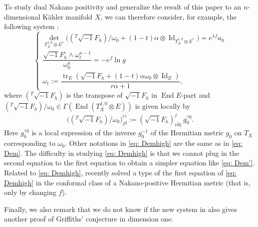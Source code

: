 \documentclass[a4, 12pt, 
]{amsart}
\numberwithin{equation}{section}
\theoremstyle{plain}
\theoremstyle{definition}
\theoremstyle{remark}
\begin{document}
To study dual Nakano positivity and generalize the result of this paper to an $n$-dimensional Kähler manifold $X$, we can therefore consider, for example, the following system \cite[equations (2.9), (2.16), and Section 2.19]{Dem21}:
\begin{equation}\label{eq: Demhigh}
    \begin{cases}
        \det_{T_X^{1,0}\otimes E^*}\big((^T\sqrt{-1}F_h)/\omega_0+(1-t)\alpha\otimes\operatorname{Id}_{T_X^{1,0}\otimes E^*}\big)=e^{\lambda f} a_0 \\
        \dfrac{\sqrt{-1}F_h^\circ\wedge\omega_t^{n-1}}{\omega_0^n}=-e^f \ln g\\
        \omega_t:=\dfrac{\operatorname{tr}_E(\sqrt{-1}F_h+(1-t)\alpha\omega_0\otimes\operatorname{Id}_E)}{r\alpha+1},
    \end{cases}
\end{equation}
where $(^T\sqrt{-1}F_h)$ is the transpose of $\sqrt{-1}F_h$ in $\operatorname{End}E$-part and $(^T\sqrt{-1}F_h)/\omega_0\in\Gamma(\operatorname{End}(T^{1,0}_X\otimes E))$ is given locally by 
$$\big((^T\sqrt{-1}F_h)/\omega_0\big)^{i\gamma}_{j\delta}:=(\sqrt{-1}F_h)^{j}_{i\delta\bar{\eta}}\ g_0^{\gamma\bar{\eta}}.$$
Here $g_0^{\gamma\bar{\eta}}$ is a local expression of the inverse $g_0^{-1}$ of the Hermitian metric $g_0$ on $T_X$ corresponding to $\omega_0$. Other notations in \eqref{eq: Demhigh} are the same as in \eqref{eq: Dem}. The difficulty in studying \eqref{eq: Demhigh} is that we cannot plug in the second equation to the first equation to obtain a simpler equation like \eqref{eq: Dem'}. Related to \eqref{eq: Demhigh}, \cite{Pan} recently solved a type of the first equation of \eqref{eq: Demhigh} in the conformal class of a Nakano-positive Hermitian metric (that is, only by changing $f$).   

Finally, we also remark that we do not know if the new system in \cite{Dem22} also gives another proof of Griffiths' conjecture in dimension one. 
\end{document}
